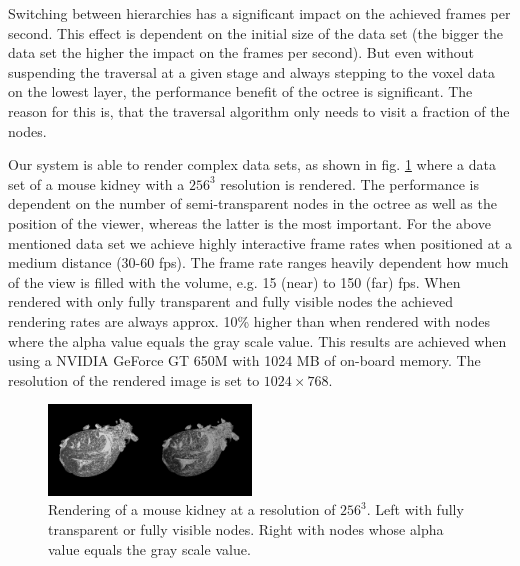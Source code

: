 \documentclass[12pt,conference]{IEEEtran}
\begin{document}
Switching between hierarchies has a significant impact on the achieved frames per second. This effect is dependent on the initial size of the data set (the bigger the data set the higher the impact on the frames per second). But even without suspending the traversal at a given stage and always stepping to the voxel data on the lowest layer, the performance benefit of the octree is significant. The reason for this is, that the traversal algorithm only needs to visit a fraction of the nodes.
\par
Our system is able to render complex data sets, as shown in fig. \ref{fig:kidneyRendering} where a data set of a mouse kidney with a $256^3$ resolution is rendered. The performance is dependent on the number of semi-transparent nodes in the octree as well as the position of the viewer, whereas the latter is the most important. For the above mentioned data set we achieve highly interactive frame rates when positioned at a medium distance (30-60 fps). The frame rate ranges heavily dependent how much of the view is filled with the volume, e.g. 15 (near) to 150 (far) fps. When rendered with only fully transparent and fully visible nodes the achieved rendering rates are always approx. 10\% higher than when rendered with nodes where the alpha value equals the gray scale value.
This results are achieved when using a NVIDIA GeForce GT 650M with 1024 MB of on-board memory. The resolution of the rendered image is set to $1024\times 768$.

\begin{figure}[htp]
	\centering
	\includegraphics[width=0.48\textwidth, trim={0.5cm 2cm 0.5cm 1.5cm}, clip]{images/kidney_256x256x256.PNG}
	\caption{Rendering of a mouse kidney at a resolution of $256^3$. Left with fully transparent or fully visible nodes. Right with nodes whose alpha value equals the gray scale value.}
	\label{fig:kidneyRendering}
\end{figure}
\end{document}
